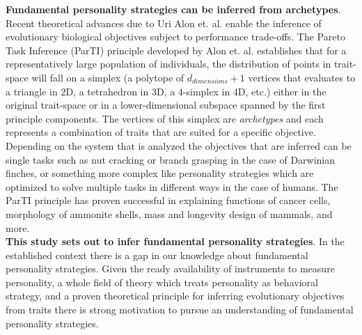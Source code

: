 \textbf{Fundamental personality strategies can be inferred from archetypes}.
Recent theoretical advances due to Uri Alon et. al. enable the inference of evolutionary biological objectives subject to performance trade-offs.
The Pareto Task Inference (ParTI) principle developed by Alon et. al. establishes that for a representatively large population of individuals, the distribution of points in trait-space will fall on a simplex (a polytope of $d_{dimensions}+1$ vertices that evaluates to a triangle in 2D, a tetrahedron in 3D, a 4-simplex in 4D, etc.) either in the original trait-space or in a lower-dimensional subspace spanned by the first principle components.
The vertices of this simplex are \textit{archetypes} and each represents a combination of traits that are suited for a specific objective.
Depending on the system that is analyzed the objectives that are inferred can be single tasks such as nut cracking or branch grasping in the case of Darwinian finches, or something more complex like personality strategies which are optimized to solve multiple tasks in different ways in the case of humans.
The ParTI principle has proven successful in explaining functions of cancer cells, morphology of ammonite shells, mass and longevity design of mammals, and more.\\

\textbf{This study sets out to infer fundamental personality strategies}.
In the established context there is a gap in our knowledge about fundamental personality strategies.
Given the ready availability of instruments to measure personality, a whole field of theory which treats personality as behavioral strategy, and a proven theoretical principle for inferring evolutionary objectives from traits there is strong motivation to pursue an understanding of fundamental personality strategies.\\

